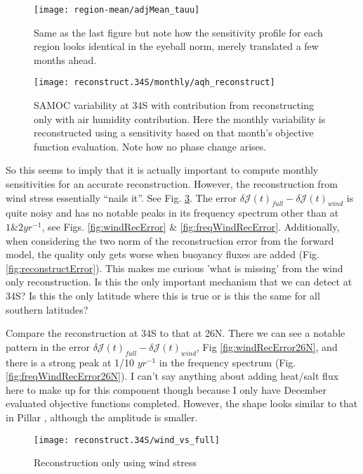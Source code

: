\documentclass[a4paper,11pt]{article}
\begin{document}
   \begin{figure}
    \centering
    \texttt{[image: region-mean/adjMean\_tauu]}
    \caption{Same as the last figure but note how the sensitivity profile for each region looks identical in the eyeball norm, merely translated a few months ahead.}
    \label{fig:bigPlotTauu}
   \end{figure}

   \begin{figure}
    \centering
    \texttt{[image: reconstruct.34S/monthly/aqh\_reconstruct]}
    \caption{SAMOC variability at 34S with contribution from reconstructing only with air humidity contribution. Here the monthly variability is reconstructed using a sensitivity based on that month's objective function evaluation. Note how no phase change arises. }
    \label{fig:aqh}
   \end{figure}

  So this seems to imply that it is actually important to compute monthly sensitivities for an accurate reconstruction. However, the reconstruction from wind stress essentially ``nails it''. See Fig. \ref{fig:windReconstruct}. The error $\delta\mathcal{J}(t)_{full} - \delta\mathcal{J}(t)_{wind}$ is quite noisy and has no notable peaks in its frequency spectrum other than at $1 \& 2 yr^{-1}$, see Figs. \ref{fig:windRecError} \& \ref{fig:freqWindRecError}. Additionally, when considering the two norm of the reconstruction error from the forward model, the quality only gets worse when buoyancy fluxes are added (Fig. \ref{fig:reconstructError}). This makes me curious 'what is missing' from the wind only reconstruction. Is this the only important mechanism that we can detect at 34S? Is this the only latitude where this is true or is this the same for all southern latitudes?  

  Compare the reconstruction at 34S to that at 26N. There we can see a notable pattern in the error $\delta\mathcal{J}(t)_{full} - \delta\mathcal{J}(t)_{wind}$, Fig \ref{fig:windRecError26N}, and there is a strong peak at 1/10 $yr^{-1}$ in the frequency spectrum (Fig. \ref{fig:freqWindRecError26N}). I can't say anything about adding heat/salt flux here to make up for this component though because I only have December evaluated objective functions completed. However, the shape looks similar to that in Pillar \cite{pillar}, although the amplitude is smaller. 

   \begin{figure}
    \centering
    \texttt{[image: reconstruct.34S/wind\_vs\_full]}
    \caption{Reconstruction only using wind stress}
    \label{fig:windReconstruct}
   \end{figure}
\end{document}
